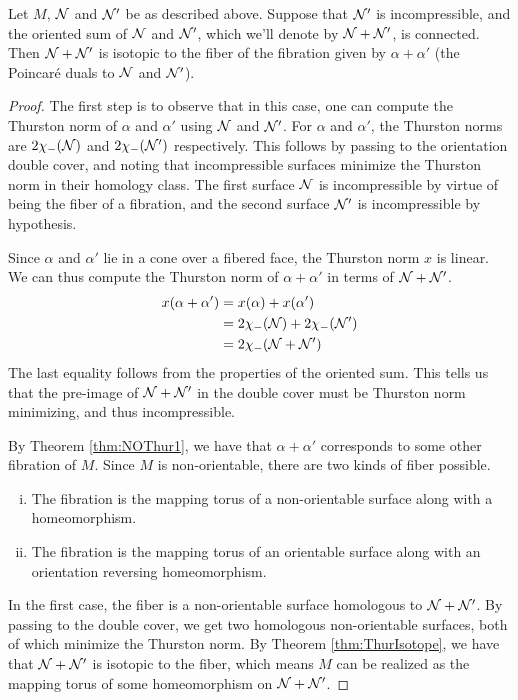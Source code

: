 \begin{thm}
  Let $M$, $\mathcal{N}$ and $\mathcal{N}'$ be as described above. Suppose that $\mathcal{N}'$ is incompressible, and the
  oriented sum of $\mathcal{N}$ and $\mathcal{N}'$, which we'll denote by $\mathcal{N} + \mathcal{N}'$, is connected. Then
  $\mathcal{N} + \mathcal{N}'$ is isotopic to the fiber of the fibration given by $\alpha + \alpha'$ (the
  Poincar\'e duals to $\mathcal{N}$ and $\mathcal{N}'$).
\end{thm}
\begin{proof}
  The first step is to observe that in this case, one can compute the Thurston norm of $\alpha$ and
  $\alpha'$ using $\mathcal{N}$ and $\mathcal{N}'$. For $\alpha$ and $\alpha'$, the Thurston norms are
  $2\chi_-(\mathcal{N})$ and $2\chi_-(\mathcal{N}')$ respectively. This follows by passing to the orientation
  double cover, and noting that incompressible surfaces minimize the Thurston norm in their
  homology class. The first surface $\mathcal{N}$ is incompressible by virtue of being the fiber of a
  fibration, and the second surface $\mathcal{N}'$ is incompressible by hypothesis.

  Since $\alpha$ and $\alpha'$ lie in a cone over a fibered face, the Thurston norm $x$ is linear.
  We can thus compute the Thurston norm of $\alpha + \alpha'$ in terms of $\mathcal{N} + \mathcal{N}'$.
  \begin{align*}
    x(\alpha + \alpha') &= x(\alpha) + x(\alpha') \\
                        &= 2\chi_-(\mathcal{N}) + 2\chi_-(\mathcal{N}') \\
                        &= 2\chi_-(\mathcal{N} + \mathcal{N}')
  \end{align*}
  The last equality follows from the properties of the oriented sum. This tells us that the
  pre-image of $\mathcal{N} + \mathcal{N}'$ in the double cover must be Thurston norm minimizing, and thus
  incompressible.

  By Theorem \ref{thm:NOThur1}, we have that $\alpha + \alpha'$ corresponds to some other fibration
  of $M$. Since $M$ is non-orientable, there are two kinds of fiber possible.
  \begin{enumerate}[(i)]
  \item The fibration is the mapping torus of a non-orientable surface along with a homeomorphism.
  \item The fibration is the mapping torus of an orientable surface along with an orientation
    reversing homeomorphism.
  \end{enumerate}
  In the first case, the fiber is a non-orientable surface homologous to $\mathcal{N} + \mathcal{N}'$. By passing
  to the double cover, we get two homologous non-orientable surfaces, both of which minimize the
  Thurston norm. By Theorem \ref{thm:ThurIsotope}, we have that $\mathcal{N} + \mathcal{N}'$ is isotopic to the
  fiber, which means $M$ can be realized as the mapping torus of some homeomorphism on
  $\mathcal{N} + \mathcal{N}'$.


\end{proof}
